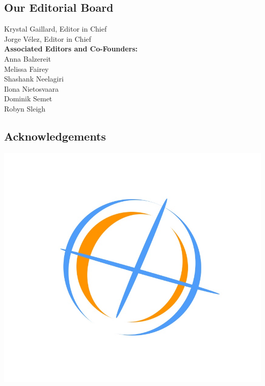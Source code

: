 \begin{center}
	\chapter{\textbf{Our Editorial Board}}
\end{center}
\begin{center}
Krystal Gaillard, Editor in Chief\\	
Jorge Vélez, Editor in Chief  \\
\vspace{5mm}
\textbf{Associated Editors and Co-Founders:}\\ 
\vspace{5mm}
Anna Balzereit\\
Melissa Fairey\\
Shashank Neelagiri\\
Ilona Nietosvaara \\
Dominik Semet\\
Robyn Sleigh
\end{center}

\begin{center}
	\chapter{\textbf{Acknowledgements}}
\end{center}
\lipsum[1]


\begin{center}
	\includegraphics[scale=0.2]{logo1}
\end{center}